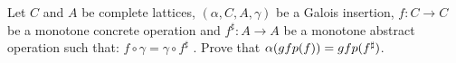 {
Let $C$ and $A$ be complete lattices, $(\alpha, C, A, \gamma)$ be a Galois insertion, $f : C \to C$ be a monotone concrete operation and $f^\sharp : A \to A$ be a monotone abstract operation such that: $f \circ \gamma = \gamma \circ f^\sharp$ . Prove that $\alpha(gfp(f )) = gfp(f^\sharp)$.
}
{}